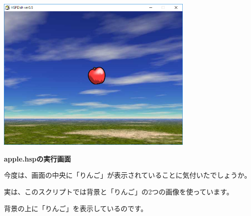 \documentclass[a4paper,dvipdfmx]{jarticle}
\begin{document}
\bigskip



\begin{center}
\includegraphics[width=9.634cm,height=7.599cm]{text04-img/text04-img015.png}

\end{center}

\bigskip


\bigskip


\bigskip


\bigskip


\bigskip


\bigskip


\bigskip


\bigskip


\bigskip


\bigskip


\bigskip


\bigskip


\bigskip

{\bfseries
apple.hspの実行画面}


\bigskip


\bigskip


\bigskip


\bigskip


\bigskip


\bigskip

今度は、画面の中央に「りんご」が表示されていることに気付いたでしょうか。


\bigskip

実は、このスクリプトでは背景と「りんご」の2つの画像を使っています。

背景の上に「りんご」を表示しているのです。


\bigskip
\end{document}
